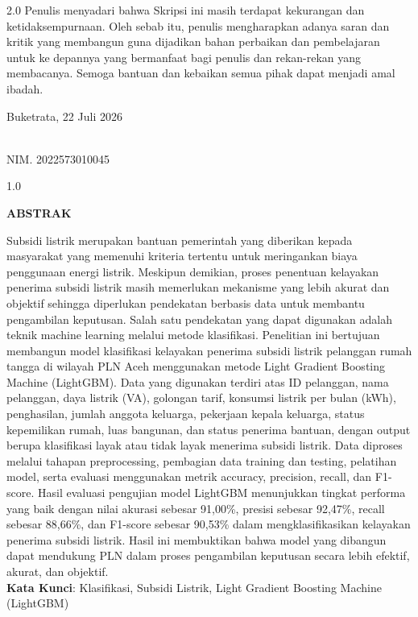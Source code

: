 \documentclass[12pt, a4paper, onecolumn, oneside]{report}
\begin{document}
\begin{spacing}{2.0}
\noindent Penulis menyadari bahwa Skripsi ini masih terdapat kekurangan dan ketidaksempurnaan. Oleh sebab itu, penulis mengharapkan adanya saran dan kritik yang membangun guna dijadikan bahan perbaikan dan pembelajaran untuk ke depannya yang bermanfaat bagi penulis dan rekan-rekan yang membacanya. Semoga bantuan dan kebaikan semua pihak dapat menjadi amal ibadah.
\end{spacing}

\vspace{1.5cm}

\begin{flushright}
Buketrata, 22 Juli 2026

\vspace{2cm}

\\
NIM. 2022573010045
\end{flushright}

\clearpage
{}
{}
\begin{spacing}{1.0}
\begin{center}
    \textbf{ABSTRAK}\\[0.5cm]
\end{center}

\noindent Subsidi listrik merupakan bantuan pemerintah yang diberikan kepada masyarakat yang memenuhi kriteria tertentu untuk meringankan biaya penggunaan energi listrik. Meskipun demikian, proses penentuan kelayakan penerima subsidi listrik masih memerlukan mekanisme yang lebih akurat dan objektif sehingga diperlukan pendekatan berbasis data untuk membantu pengambilan keputusan. Salah satu pendekatan yang dapat digunakan adalah teknik machine learning melalui metode klasifikasi. Penelitian ini bertujuan membangun model klasifikasi kelayakan penerima subsidi listrik pelanggan rumah tangga di wilayah PLN Aceh menggunakan metode Light Gradient Boosting Machine (LightGBM). Data yang digunakan terdiri atas ID pelanggan, nama pelanggan, daya listrik (VA), golongan tarif, konsumsi listrik per bulan (kWh), penghasilan, jumlah anggota keluarga, pekerjaan kepala keluarga, status kepemilikan rumah, luas bangunan, dan status penerima bantuan, dengan output berupa klasifikasi layak atau tidak layak menerima subsidi listrik. Data diproses melalui tahapan preprocessing, pembagian data training dan testing, pelatihan model, serta evaluasi menggunakan metrik accuracy, precision, recall, dan F1-score. Hasil evaluasi pengujian model LightGBM menunjukkan tingkat performa yang baik dengan nilai akurasi sebesar 91,00\%, presisi sebesar 92,47\%, recall sebesar 88,66\%, dan F1-score sebesar 90,53\% dalam mengklasifikasikan kelayakan penerima subsidi listrik. Hasil ini membuktikan bahwa model yang dibangun dapat mendukung PLN dalam proses pengambilan keputusan secara lebih efektif, akurat, dan objektif.\\[0.6cm]

\noindent \textbf{Kata Kunci}: Klasifikasi, Subsidi Listrik, Light Gradient Boosting Machine (LightGBM)
\end{spacing}
\end{document}
